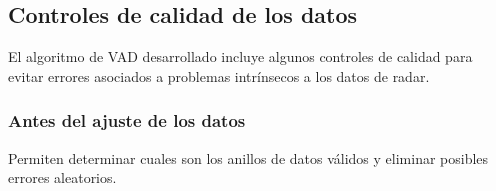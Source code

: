 \documentclass[12pt,spanish,oneside, a4paper]{book}
\begin{document}
\subsection{Controles de calidad de los
datos}\label{controles-de-calidad-de-los-datos}

El algoritmo de VAD desarrollado incluye algunos controles de calidad
para evitar errores asociados a problemas intrínsecos a los datos de
radar.

\subsubsection{Antes del ajuste de los
datos}\label{antes-del-ajuste-de-los-datos}

Permiten determinar cuales son los anillos de datos válidos y eliminar
posibles errores aleatorios.
\end{document}
